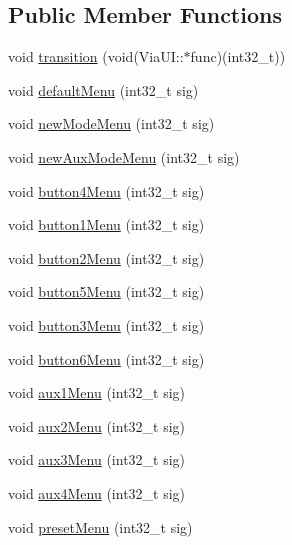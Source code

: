 \subsection*{Public Member Functions}
\begin{DoxyCompactItemize}
\item 
void \mbox{\hyperlink{class_via_u_i_a99373a450c4c494a6261edbfc3b21fd9}{transition}} (void(Via\+U\+I\+::$\ast$func)(int32\+\_\+t))
\item 
void \mbox{\hyperlink{class_via_u_i_af80f2151bdd13bc6e84517064100ed92}{default\+Menu}} (int32\+\_\+t sig)
\item 
void \mbox{\hyperlink{class_via_u_i_ac0e9dd4f7b102c712e14d9ee062dcaf7}{new\+Mode\+Menu}} (int32\+\_\+t sig)
\item 
void \mbox{\hyperlink{class_via_u_i_a104b7dbb35cab9ac82b61f364052dc07}{new\+Aux\+Mode\+Menu}} (int32\+\_\+t sig)
\item 
void \mbox{\hyperlink{class_via_u_i_a4d97fe8dca5340f69e5b4441928e4364}{button4\+Menu}} (int32\+\_\+t sig)
\item 
void \mbox{\hyperlink{class_via_u_i_ae921a22294017c3a1aa3e670d30768a1}{button1\+Menu}} (int32\+\_\+t sig)
\item 
void \mbox{\hyperlink{class_via_u_i_a98cab09e693942478ce7136e3077276a}{button2\+Menu}} (int32\+\_\+t sig)
\item 
void \mbox{\hyperlink{class_via_u_i_a0d3e2a3c83ad6781e9e403062131d205}{button5\+Menu}} (int32\+\_\+t sig)
\item 
void \mbox{\hyperlink{class_via_u_i_a4c6811c74f2c1cfadd84be925ed905fc}{button3\+Menu}} (int32\+\_\+t sig)
\item 
void \mbox{\hyperlink{class_via_u_i_aed3d9b75b2d67b17a5596597aa59cf26}{button6\+Menu}} (int32\+\_\+t sig)
\item 
void \mbox{\hyperlink{class_via_u_i_aaee6701bf5a06d4064caa2443d96f61d}{aux1\+Menu}} (int32\+\_\+t sig)
\item 
void \mbox{\hyperlink{class_via_u_i_a928f20f199d42ce05487d5ed7bffd574}{aux2\+Menu}} (int32\+\_\+t sig)
\item 
void \mbox{\hyperlink{class_via_u_i_adf0e11621a20477354eb1169c3943cb8}{aux3\+Menu}} (int32\+\_\+t sig)
\item 
void \mbox{\hyperlink{class_via_u_i_a9e082c0b454b4fe05a9fc48ca922f9b5}{aux4\+Menu}} (int32\+\_\+t sig)
\item 
void \mbox{\hyperlink{class_via_u_i_a5a2d75e2625e2b55f0588ba8925fe45f}{preset\+Menu}} (int32\+\_\+t sig)
\item 

\end{DoxyCompactItemize}
